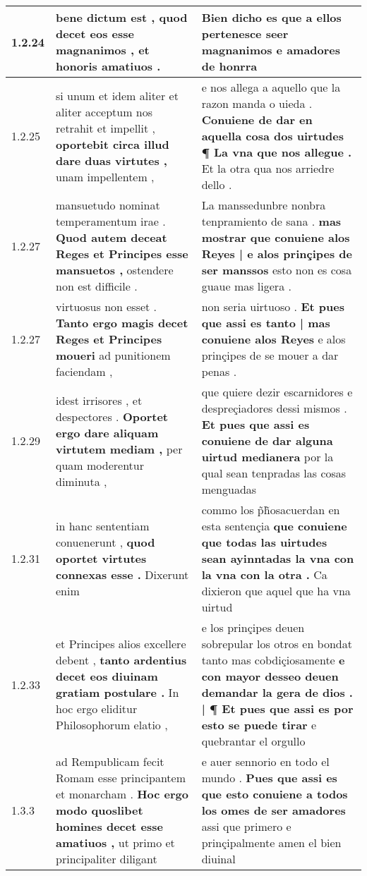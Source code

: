 \begin{tabular}{|p{1cm}|p{6.5cm}|p{6.5cm}|}
1.2.24 & bene dictum est , \textbf{ quod decet eos esse magnanimos , } et honoris amatiuos . & Bien dicho es \textbf{ que a ellos pertenesce seer magnanimos } e amadores de honrra \\\hline
1.2.25 & si unum et idem aliter et aliter acceptum nos retrahit et impellit , \textbf{ oportebit circa illud dare duas virtutes , } unam impellentem , & e nos allega a aquello que la razon manda o uieda . \textbf{ Conuiene de dar en aquella cosa dos uirtudes ¶ La vna que nos allegue . } Et la otra qua nos arriedre dello . \\\hline
1.2.27 & mansuetudo nominat temperamentum irae . \textbf{ Quod autem deceat Reges et Principes esse mansuetos , } ostendere non est difficile . & La manssedunbre nonbra tenpramiento de sana . \textbf{ mas mostrar que conuiene alos Reyes | e alos prinçipes de ser manssos } esto non es cosa guaue mas ligera . \\\hline
1.2.27 & virtuosus non esset . \textbf{ Tanto ergo magis decet Reges et Principes moueri } ad punitionem faciendam , & non seria uirtuoso . \textbf{ Et pues que assi es tanto | mas conuiene alos Reyes } e alos prinçipes de se mouer a dar penas . \\\hline
1.2.29 & idest irrisores , et despectores . \textbf{ Oportet ergo dare aliquam virtutem mediam , } per quam moderentur diminuta , & que quiere dezir escarnidores e despreçiadores dessi mismos . \textbf{ Et pues que assi es conuiene de dar alguna uirtud medianera } por la qual sean tenpradas las cosas menguadas \\\hline
1.2.31 & in hanc sententiam conuenerunt , \textbf{ quod oportet virtutes connexas esse . } Dixerunt enim & commo los p̃h̃osacuerdan en esta sentençia \textbf{ que conuiene que todas las uirtudes sean ayinntadas la vna con la vna con la otra . } Ca dixieron que aquel que ha vna uirtud \\\hline
1.2.33 & et Principes alios excellere debent , \textbf{ tanto ardentius decet eos diuinam gratiam postulare . } In hoc ergo eliditur Philosophorum elatio , & e los prinçipes deuen sobrepular los otros en bondat tanto mas cobdiçiosamente \textbf{ e con mayor desseo deuen demandar la gera de dios . | ¶ Et pues que assi es por esto se puede tirar } e quebrantar el orgullo \\\hline
1.3.3 & ad Rempublicam fecit Romam esse principantem et monarcham . \textbf{ Hoc ergo modo quoslibet homines decet esse amatiuos , } ut primo et principaliter diligant & e auer sennorio en todo el mundo . \textbf{ Pues que assi es que esto conuiene a todos los omes de ser amadores } assi que primero e prinçipalmente amen el bien diuinal \\\hline

\end{tabular}
